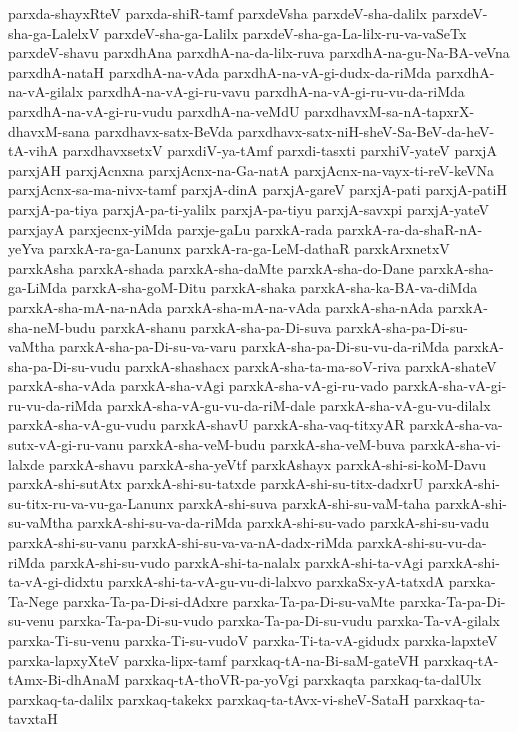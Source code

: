 {parxda-shayxRteV
parxda-shiR-tamf
parxdeVsha
parxdeV-sha-dalilx
parxdeV-sha-ga-LalelxV
parxdeV-sha-ga-Lalilx
parxdeV-sha-ga-La-lilx-ru-va-vaSeTx
parxdeV-shavu
parxdhAna
parxdhA-na-da-lilx-ruva
parxdhA-na-gu-Na-BA-veVna
parxdhA-nataH
parxdhA-na-vAda
parxdhA-na-vA-gi-dudx-da-riMda
parxdhA-na-vA-gilalx
parxdhA-na-vA-gi-ru-vavu
parxdhA-na-vA-gi-ru-vu-da-riMda
parxdhA-na-vA-gi-ru-vudu
parxdhA-na-veMdU
parxdhavxM-sa-nA-tapxrX-dhavxM-sana
parxdhavx-satx-BeVda
parxdhavx-satx-niH-sheV-Sa-BeV-da-heV-tA-vihA
parxdhavxsetxV
parxdiV-ya-tAmf
parxdi-tasxti
parxhiV-yateV
parxjA
parxjAH
parxjAcnxna
parxjAcnx-na-Ga-natA
parxjAcnx-na-vayx-ti-reV-keVNa
parxjAcnx-sa-ma-nivx-tamf
parxjA-dinA
parxjA-gareV
parxjA-pati
parxjA-patiH
parxjA-pa-tiya
parxjA-pa-ti-yalilx
parxjA-pa-tiyu
parxjA-savxpi
parxjA-yateV
parxjayA
parxjecnx-yiMda
parxje-gaLu
parxkA-rada
parxkA-ra-da-shaR-nA-yeYva
parxkA-ra-ga-Lanunx
parxkA-ra-ga-LeM-dathaR
parxkArxnetxV
parxkAsha
parxkA-shada
parxkA-sha-daMte
parxkA-sha-do-Dane
parxkA-sha-ga-LiMda
parxkA-sha-goM-Ditu
parxkA-shaka
parxkA-sha-ka-BA-va-diMda
parxkA-sha-mA-na-nAda
parxkA-sha-mA-na-vAda
parxkA-sha-nAda
parxkA-sha-neM-budu
parxkA-shanu
parxkA-sha-pa-Di-suva
parxkA-sha-pa-Di-su-vaMtha
parxkA-sha-pa-Di-su-va-varu
parxkA-sha-pa-Di-su-vu-da-riMda
parxkA-sha-pa-Di-su-vudu
parxkA-shashacx
parxkA-sha-ta-ma-soV-riva
parxkA-shateV
parxkA-sha-vAda
parxkA-sha-vAgi
parxkA-sha-vA-gi-ru-vado
parxkA-sha-vA-gi-ru-vu-da-riMda
parxkA-sha-vA-gu-vu-da-riM-dale
parxkA-sha-vA-gu-vu-dilalx
parxkA-sha-vA-gu-vudu
parxkA-shavU
parxkA-sha-vaq-titxyAR
parxkA-sha-va-sutx-vA-gi-ru-vanu
parxkA-sha-veM-budu
parxkA-sha-veM-buva
parxkA-sha-vi-lalxde
parxkA-shavu
parxkA-sha-yeVtf
parxkAshayx
parxkA-shi-si-koM-Davu
parxkA-shi-sutAtx
parxkA-shi-su-tatxde
parxkA-shi-su-titx-dadxrU
parxkA-shi-su-titx-ru-va-vu-ga-Lanunx
parxkA-shi-suva
parxkA-shi-su-vaM-taha
parxkA-shi-su-vaMtha
parxkA-shi-su-va-da-riMda
parxkA-shi-su-vado
parxkA-shi-su-vadu
parxkA-shi-su-vanu
parxkA-shi-su-va-va-nA-dadx-riMda
parxkA-shi-su-vu-da-riMda
parxkA-shi-su-vudo
parxkA-shi-ta-nalalx
parxkA-shi-ta-vAgi
parxkA-shi-ta-vA-gi-didxtu
parxkA-shi-ta-vA-gu-vu-di-lalxvo
parxkaSx-yA-tatxdA
parxka-Ta-Nege
parxka-Ta-pa-Di-si-dAdxre
parxka-Ta-pa-Di-su-vaMte
parxka-Ta-pa-Di-su-venu
parxka-Ta-pa-Di-su-vudo
parxka-Ta-pa-Di-su-vudu
parxka-Ta-vA-gilalx
parxka-Ti-su-venu
parxka-Ti-su-vudoV
parxka-Ti-ta-vA-gidudx
parxka-lapxteV
parxka-lapxyXteV
parxka-lipx-tamf
parxkaq-tA-na-Bi-saM-gateVH
parxkaq-tA-tAmx-Bi-dhAnaM
parxkaq-tA-thoVR-pa-yoVgi
parxkaqta
parxkaq-ta-dalUlx
parxkaq-ta-dalilx
parxkaq-takekx
parxkaq-ta-tAvx-vi-sheV-SataH
parxkaq-ta-tavxtaH
}
